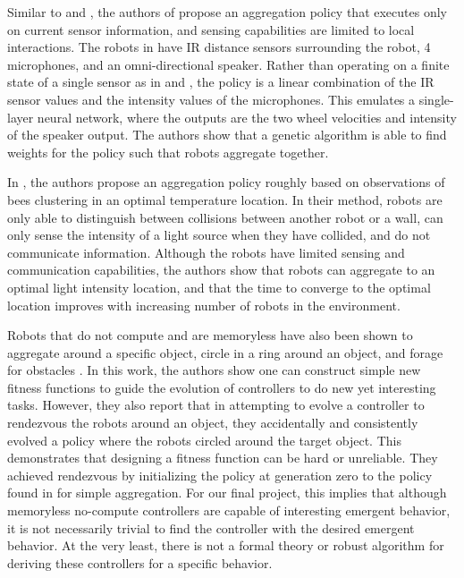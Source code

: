 \documentclass[conference]{IEEEtran}
\begin{document}
    Similar to \cite{gauci_self-organized_2014} and \cite{gauci_evolving_2014}, the authors of \cite{bahgeci_evolving_2005} propose an aggregation policy that executes only on current sensor information, and sensing capabilities are limited to local interactions. The robots in \cite{bahgeci_evolving_2005} have IR distance sensors surrounding the robot, 4 microphones, and an omni-directional speaker.  Rather than operating on a finite state of a single sensor as in \cite{gauci_self-organized_2014} and \cite{gauci_evolving_2014}, the policy is a linear combination of the IR sensor values and the intensity values of the microphones.  This emulates a single-layer neural network, where the outputs are the two wheel velocities and intensity of the speaker output.  The authors show that a genetic algorithm is able to find weights for the policy such that robots aggregate together.

    In \cite{kernbach_re-embodiment_2009}, the authors propose an aggregation policy roughly based on observations of bees clustering in an optimal temperature location. In their method, robots are only able to distinguish between collisions between another robot or a wall, can only sense the intensity of a light source when they have collided, and do not communicate information.  Although the robots have limited sensing and communication capabilities, the authors show that robots can aggregate to an optimal light intensity location, and that the time to converge to the optimal location improves with increasing number of robots in the environment.

    Robots that do not compute and are memoryless have also been shown to aggregate around a specific object, circle in a ring around an object, and forage for obstacles \cite{johnson_evolving_2016}. In this work, the authors show one can construct simple new fitness functions to guide the evolution of controllers to do new yet interesting tasks. However, they also report that in attempting to evolve a controller to rendezvous the robots around an object, they accidentally and consistently evolved a policy where the robots circled around the target object. This demonstrates that designing a fitness function can be hard or unreliable. They achieved rendezvous by initializing the policy at generation zero to the policy found in \cite{gauci_self-organized_2014} for simple aggregation. For our final project, this implies that although memoryless no-compute controllers are capable of interesting emergent behavior, it is not necessarily trivial to find the controller with the desired emergent behavior. At the very least, there is not a formal theory or robust algorithm for deriving these controllers for a specific behavior.
\end{document}
